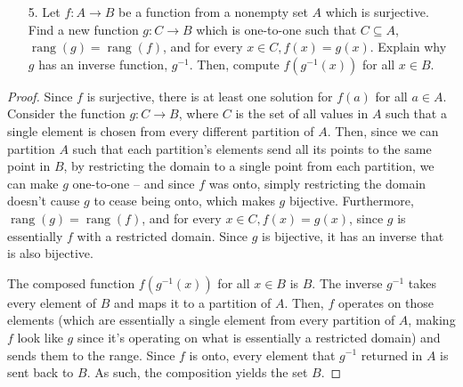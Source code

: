 \documentclass[10pt]{article}
\theoremstyle{definition}
\theoremstyle{plain}
\DeclareMathOperator\rang{rang}
\begin{document}
\pagebreak



\begin{enumerate}
\item[5.] Let $f:A \to B$ be a function from a nonempty set $A$ which is surjective.  Find a new function $g:C \to B$ which is one-to-one such that $C \subseteq A$, $\rang(g) = \rang(f)$, and for every $x \in C, f(x) = g(x)$.  Explain why $g$ has an inverse function, $g^{-1}$.  Then, compute $f(g^{-1}(x))$ for all $x \in B$.
\end{enumerate}



\begin{proof}
Since $f$ is surjective, there is at least one solution for $f(a)$ for all $a\in A$. Consider the function $g:C\to B$, where $C$ is the set of all values in $A$ such that a single element is chosen from every different partition of $A$. Then, since we can partition $A$ such that each partition's elements send all its points to the same point in $B$, by restricting the domain to a single point from each partition, we can make $g$ one-to-one -- and since $f$ was onto, simply restricting the domain doesn't cause $g$ to cease being onto, which makes $g$ bijective. Furthermore, $\rang(g) = \rang(f)$, and for every $x \in C, f(x) = g(x)$, since $g$ is essentially $f$ with a restricted domain. Since $g$ is bijective, it has an inverse that is also bijective.

The composed function $f(g^{-1}(x))$ for all $x \in B$ is $B$. The inverse $g^{-1}$ takes every element of $B$ and maps it to a partition of $A$. Then, $f$ operates on those elements (which are essentially a single element from every partition of $A$, making $f$ look like $g$ since it's operating on what is essentially a restricted domain) and sends them to the range. Since $f$ is onto, every element that $g^{-1}$ returned in $A$ is sent back to $B$. As such, the composition yields the set $B$.
\end{proof}
\end{document}
